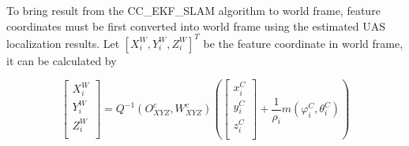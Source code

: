 To bring result from the CC\_EKF\_SLAM algorithm to world frame, feature
coordinates must be first converted into world frame using the
estimated UAS localization results. Let $[X_i^W,Y_i^W, Z_i^W]^T$ be
the feature coordinate in world frame, it can be calculated by

\begin{equation}
  \left[ \begin{array}{c}
    X_{i}^{W}  \\
    Y_{i}^{W}  \\
    Z_{i}^{W}  \\
  \end{array} \right]=Q^{-1}(O_{XYZ}^{c}, W_{XYZ}^{c})\left(\left[
    \begin{array}{c}
      x_{i}^{C} \\
      y_{i}^{C} \\
      z_{i}^{C} \\
    \end{array}
  \right]+\frac{1}{\rho _{i}}m(\varphi _{i}^{C},\theta_{i}^{C})\right)
\end{equation}

